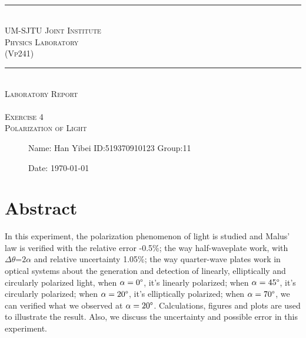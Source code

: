 \documentclass[12pt,a4paper]{article}
\begin{document}
\begin{center}
~\\
\rule[0mm]{400pt}{0.5pt}
\Large{ \textsc{\newline\\UM-SJTU Joint Institute\\Physics Laboratory\\(Vp241)\\}}
\rule[0mm]{400pt}{0.5pt}
\Large{ \textsc{\newline\newline\newline\newline\newline\newline\\
Laboratory Report\\}}
\Large{\textsc{ \\ Exercise 4  \\ Polarization of Light} }

\end{center}

\begin{description}
    \item[] 
    \item[] 
    \item[] 
    \item[] 
    \item[] 
    \item[]
    \item[]\qquad \qquad Name: Han Yibei \qquad ID:519370910123   \qquad    Group:11\\
    \item[]\qquad \qquad Date: \today
\end{description}

\newpage

\section{Abstract}
In this experiment, the polarization phenomenon of light is studied and Malus' law is verified with the relative error -0.5\%; the way half-waveplate work, with $\Delta\theta$=$2\alpha$ and relative uncertainty 1.05\%; the way quarter-wave plates work in optical systems about the generation and detection of linearly, elliptically and circularly polarized light, when $\alpha=0\degree$, it's linearly polarized; when $\alpha=45\degree$, it's circularly polarized; when $\alpha=20\degree$, it's elliptically polarized; when $\alpha=70\degree$, we can verified what we observed at $\alpha=20\degree$. Calculations, figures and plots are used to  illustrate the result. Also, we discuss the uncertainty and possible error in this experiment.
\end{document}
